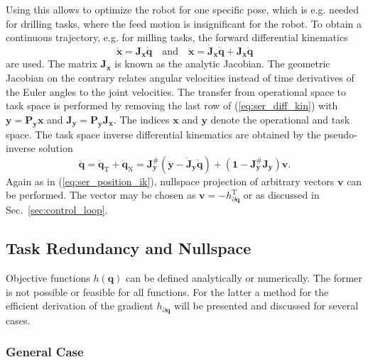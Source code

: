 \documentclass[a4paper,twoside]{article}
\newcommand{\transp}[0]{{\mathrm{T}}}
\begin{document}
Using this allows to optimize the robot for one specific pose, which is e.g. needed for drilling tasks, where the feed motion is insignificant for the robot.
To obtain a continuous trajectory, e.g. for milling tasks, the forward differential kinematics 
\begin{equation}
\dot{\bm{x}}=\bm{J}_{\bm{x}} \dot{\bm{q}}\quad\mathrm{and}\quad \ddot{\bm{x}}=\dot{\bm{J}}_{\bm{x}} \dot{\bm{q}} + \bm{J}_{\bm{x}} \ddot{\bm{q}}
\label{eq:ser_diff_kin}
\end{equation}
are used.
The matrix $\bm{J}_{\bm{x}}$ is known as the analytic Jacobian.
The geometric Jacobian on the contrary relates angular velocities instead of time derivatives of the Euler angles to the joint velocities.
The transfer from operational space to task space is performed by removing the last row of (\ref{eq:ser_diff_kin}) with $\bm{y}=\bm{P}_{\bm{y}} \bm{x}$ and $\bm{J}_{\bm{y}} = \bm{P}_{\bm{y}} \bm{J}_{\bm{x}}$. %
The indices $\bm{x}$ and $\bm{y}$ denote the operational and task space.
%
The task space inverse differential kinematics are obtained by the pseudo-inverse solution
\begin{equation}
\ddot{\bm{q}}
=\ddot{\bm{q}}_\mathrm{T}+\ddot{\bm{q}}_\mathrm{N}
= \bm{J}_{\bm{y}}^{\#}(\ddot{\bm{y}} - \dot{\bm{J}}_{\bm{y}} \dot{\bm{q}}) + (\bm{1}-\bm{J}_{\bm{y}}^{\#}\bm{J}_{\bm{y}}) \bm{v}.
\label{eq:ser_accel_ik}
\end{equation}
Again as in (\ref{eq:ser_position_ik}), nullspace projection of arbitrary vectors $\bm{v}$ can be performed.
The vector may be chosen as $\bm{v}=-h_{\partial \bm{q}}^\transp$ or as discussed in Sec.~\ref{sec:control_loop}.


\subsection{Task Redundancy and Nullspace}
\label{sec:nullspace_serrob}

Objective functions $h(\bm{q})$ can be defined analytically or numerically.
The former is not possible or feasible for all functions.
For the latter a method for the efficient derivation of the gradient $h_{\partial \bm{q}}$ will be presented and discussed for several cases.

\subsubsection{General Case}
\end{document}
